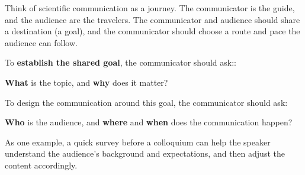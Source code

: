 \documentclass[%
reprint,
superscriptaddress,
nofootinbib,
 aps,
floatfix,
]{revtex4-2}
\begin{document}
Think of scientific communication as a journey. 
The communicator is the guide, and the audience are the travelers. 
The communicator and audience should share a destination (a goal), and the communicator should choose a route and pace the audience can follow.

To \textbf{establish the shared goal}, the communicator should ask:: 
\begin{center}
\textbf{What} is the topic, and \textbf{why} does it matter?
\end{center}
To design the communication around this goal, the communicator should ask: 
\begin{center}
\textbf{Who} is the audience, and \textbf{where} and \textbf{when} does the communication happen?
\end{center}
As one example, a quick survey before a colloquium can help the speaker understand the audience's background and expectations, and then adjust the content accordingly. 
\end{document}

